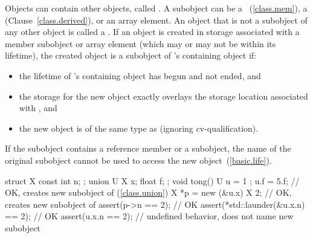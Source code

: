 \pnum
{}%
Objects can contain other objects, called .
A subobject can be
a ~(\ref{class.mem}), a 
(Clause~\ref{class.derived}), or an array element.
%
An object that is not a subobject of any other object is called a .
If an object is created
in storage associated with a member subobject or array element 
(which may or may not be within its lifetime),
the created object
is a subobject of 's containing object if:
\begin{itemize}
\item
the lifetime of 's containing object has begun and not ended, and
\item
the storage for the new object exactly overlays the storage location associated with , and
\item
the new object is of the same type as  (ignoring cv-qualification).
\end{itemize}
\begin{note}
If the subobject contains a reference member or a  subobject,
the name of the original subobject cannot be used to access the new object~(\ref{basic.life}).
\end{note}
\begin{example}
\begin{codeblock}
struct X { const int n; };
union U { X x; float f; };
void tong() {
  U u = {{ 1 }};
  u.f = 5.f;                          // OK, creates new subobject of  (\ref{class.union})
  X *p = new (&u.x) X {2};            // OK, creates new subobject of 
  assert(p->n == 2);                  // OK
  assert(*std::launder(&u.x.n) == 2); // OK
  assert(u.x.n == 2);                 // undefined behavior,  does not name new subobject
}
\end{codeblock}
\end{example}

